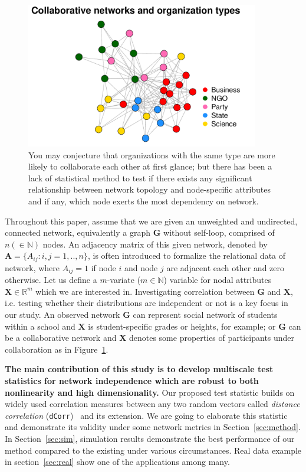 \documentclass[12pt]{article}
\theoremstyle{definition}
\begin{document}
\begin{figure}[h]
	\centering
	\includegraphics[width=4in]{../Figure/introplot.pdf}	
	\caption{You may conjecture that organizations with the same type are more likely to collaborate each other at first glance; but there has been a lack of statistical method to test if there exists any significant relationship between network topology and node-specific attributes and if any, which node exerts the most dependency on network.}
	\label{fig:intro}
\end{figure}

Throughout this paper, assume that we are given an unweighted and undirected, connected network, equivalently a graph $\mathbf{G}$ without self-loop, comprised of $n (\in \mathbb{N})$ nodes. An adjacency matrix of this given network, denoted by $\mathbf{A} = \{A_{ij} : i,j= 1,..,n \}$, is often introduced to formalize the relational data of network, where $A_{ij} = 1$ if node $i$ and node $j$ are adjacent each other and zero otherwise. Let us define a $m$-variate ($m \in \mathbb{N}$) variable for nodal attributes $\mathbf{X}  \in \mathbb{R}^{m}$ which we are interested in. Investigating correlation between $\mathbf{G}$ and $\mathbf{X}$, i.e. testing whether their distributions are independent or not is a key focus in our study. An observed network $\mathbf{G}$ can represent social network of students within a school and $\mathbf{X}$ is student-specific grades or heights, for example; or $\mathbf{G}$ can be a collaborative network and $\mathbf{X}$ denotes some properties of participants under collaboration as in Figure~\ref{fig:intro}. 
	
\textbf{The main contribution of this study is to develop multiscale test statistics for network independence which are robust to both nonlinearity and high dimensionality.} Our proposed test statistic builds on widely used correlation measures between any two random vectors called \textit{distance correlation} (\texttt{dCorr})~\citep{szekely2007measuring} and its extension. We are going to elaborate this statistic and demonstrate its validity under some network metrics in Section~\ref{sec:method}. In Section~\ref{sec:sim}, simulation results demonstrate the best performance of our method compared to the existing under various circumstances. Real data example in section~\ref{sec:real} show one of the applications among many.  
	
\end{document}
